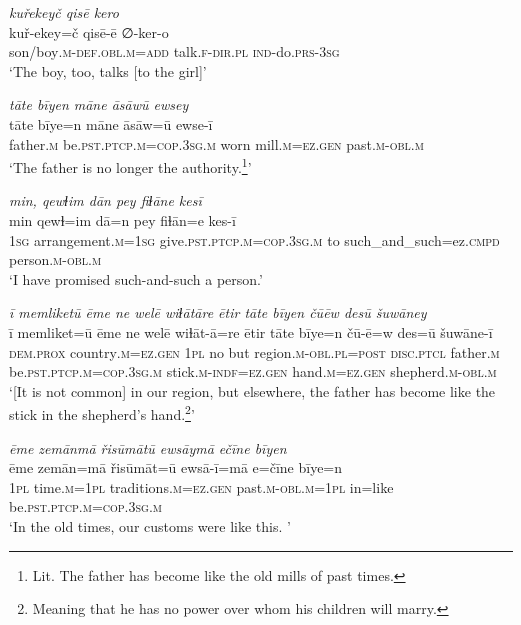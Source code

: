 \ea \label{RE.32}
\textit{kuřekeyč qisē kero} \\ 
\gll kuř-ekey=č qisē-ē ∅-ker-o \\ 
 son/boy\textsc{.m}\textsc{-def}\textsc{.obl}\textsc{.m}\textsc{=add} talk\textsc{.f}\textsc{-dir}\textsc{.pl} \textsc{ind-}do\textsc{.prs}\textsc{-3sg} \\ 
\glt `The boy, too, talks [to the girl]'
\z 
 
\ea \label{RE.33}
\textit{tāte bīyen māne āsāwū ewsey} \\ 
\gll tāte bīye=n māne āsāw=ū ewse-ī \\ 
 father\textsc{.m} be\textsc{.pst}\textsc{.ptcp}\textsc{.m}\textsc{=cop}\textsc{.3sg}\textsc{.m} worn mill\textsc{.m}\textsc{=ez.gen} past\textsc{.m}\textsc{-obl}\textsc{.m} \\ 
\glt `The father is no longer the authority.\footnote{Lit. The father has become like the old mills of past times.}'
\z 
 
\ea \label{RE.36}
\textit{min, qewɫim dān pey fiɫāne kesī} \\ 
\gll min qewɫ=im dā=n pey fiɫān=e kes-ī \\ 
 \textsc{1sg} arrangement\textsc{.m}\textsc{=\textsc{1sg}} give\textsc{.pst}\textsc{.ptcp}\textsc{.m}\textsc{=cop}\textsc{.3sg}\textsc{.m} to such\_and\_such=ez\textsc{.cmpd} person\textsc{.m}\textsc{-obl}\textsc{.m} \\ 
\glt `I have promised such-and-such a person.'
\z 
 
\ea \label{RE.41}
\textit{ī memliketū ēme ne welē wiɫātāre ētir tāte bīyen čūēw desū šuwāney} \\ 
\gll ī memliket=ū ēme ne welē wiɫāt-ā=re ētir tāte bīye=n čū-ē=w des=ū šuwāne-ī \\ 
 \textsc{dem.prox} country\textsc{.m}\textsc{=ez.gen} \textsc{1pl} no but region\textsc{.m}\textsc{-obl}\textsc{.pl}\textsc{=\textsc{post}} \textsc{disc.ptcl} father\textsc{.m} be\textsc{.pst}\textsc{.ptcp}\textsc{.m}\textsc{=cop}\textsc{.3sg}\textsc{.m} stick\textsc{.m}\textsc{-indf}\textsc{=ez.gen} hand\textsc{.m}\textsc{=ez.gen} shepherd\textsc{.m}\textsc{-obl}\textsc{.m} \\ 
\glt `[It is not common] in our region, but elsewhere, the father has become like the stick in the shepherd’s hand.\footnote{Meaning that he has no power over whom his children will marry.}'
\z 
 
\ea \label{RE.42}
\textit{ēme zemānmā řisūmātū ewsāymā ečīne bīyen} \\ 
\gll ēme zemān=mā řisūmāt=ū ewsā-ī=mā e=čīne bīye=n \\ 
 \textsc{1pl} time\textsc{.m}\textsc{=\textsc{1pl}} traditions\textsc{.m}\textsc{=ez.gen} past\textsc{.m}\textsc{-obl}\textsc{.m}\textsc{=\textsc{1pl}} in=like be\textsc{.pst}\textsc{.ptcp}\textsc{.m}\textsc{=cop}\textsc{.3sg}\textsc{.m} \\ 
\glt `In the old times, our customs were like this. '
\z 
 
